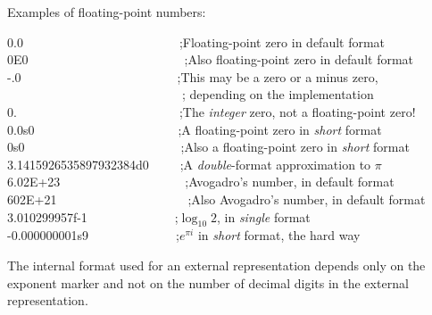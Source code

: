 Examples of floating-point numbers:
\begin{lisp}
0.0~~~~~~~~~~~~~~~~~~~~~~~~~;\textrm{Floating-point zero in default format} \\
0E0~~~~~~~~~~~~~~~~~~~~~~~~~;\textrm{Also floating-point zero in default format} \\
-.0~~~~~~~~~~~~~~~~~~~~~~~~~;\textrm{This may be a zero or a minus zero,} \\
~~~~~~~~~~~~~~~~~~~~~~~~~~~~; \textrm{depending on the implementation} \\
0.~~~~~~~~~~~~~~~~~~~~~~~~~~;\textrm{The \emph{integer} zero, not a floating-point zero!} \\
0.0s0~~~~~~~~~~~~~~~~~~~~~~~;\textrm{A floating-point zero in \emph{short} format} \\
0s0~~~~~~~~~~~~~~~~~~~~~~~~~;\textrm{Also a floating-point zero in \emph{short} format} \\
3.1415926535897932384d0~~~~~;\textrm{A \emph{double}-format approximation to $\pi$} \\
6.02E+23~~~~~~~~~~~~~~~~~~~~;\textrm{Avogadro's number, in default format} \\
602E+21~~~~~~~~~~~~~~~~~~~~~;\textrm{Also Avogadro's number, in default format} \\
3.010299957f-1~~~~~~~~~~~~~~;\textrm{$\log_{10} 2$, in \emph{single} format} \\
-0.000000001s9~~~~~~~~~~~~~~;\textrm{$e^{\pi i}$ in \emph{short} format, the hard way}
\end{lisp}

The internal format used for an external representation depends only
on the exponent marker and not on the number of decimal digits
in the external representation.

